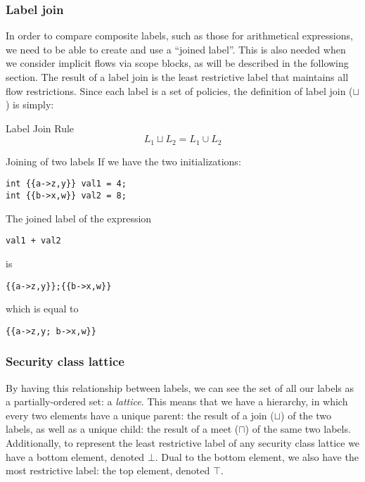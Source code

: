 \subsubsection{Label join}
In order to compare composite labels, such as those for arithmetical expressions, we need to be able to create and use a ``joined label''.
This is also needed when we consider implicit flows via scope blocks, as will be described in the following section.
The result of a label join is the least restrictive label that maintains all flow restrictions.
Since each label is a set of policies, the definition of label join ($\sqcup$) is simply:

\begin{definition}{Label Join Rule}
  \[
    L_1 \sqcup L_2 = L_1 \cup L_2
  \]
\end{definition}

\begin{example}{Joining of two labels}
  If we have the two initializations:
  \begin{lstlisting}[style=dlmc]
int {{a->z,y}} val1 = 4;
int {{b->x,w}} val2 = 8;
  \end{lstlisting}
  The joined label of the expression\\
  \begin{lstlisting}[style=dlmc]
val1 + val2
  \end{lstlisting}
  is
  \begin{lstlisting}[style=dlmc]
{{a->z,y}};{{b->x,w}}
  \end{lstlisting}
  which is equal to
  \begin{lstlisting}[style=dlmc]
{{a->z,y; b->x,w}}
  \end{lstlisting}
\end{example}

\subsubsection{Security class lattice}
By having this relationship between labels, we can see the set of all our labels as a partially-ordered set: a \emph{lattice}.
This means that we have a hierarchy, in which every two elements have a unique parent: the result of a join ($\sqcup$) of the two labels, as well as a unique child: the result of a meet ($\sqcap$) of the same two labels.
Additionally, to represent the least restrictive label of any security class lattice we have a bottom element, denoted $\bot$.
Dual to the bottom element, we also have the most restrictive label: the top element, denoted $\top$.

